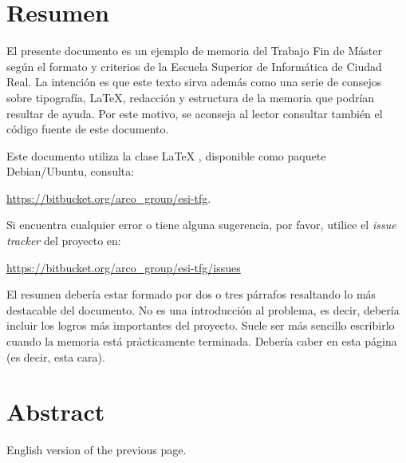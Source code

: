 \chapter{Resumen}

El presente documento es un ejemplo de memoria del Trabajo Fin de Máster según
el formato y criterios de la Escuela Superior de Informática de Ciudad Real. La
intención es que este texto sirva además como una serie de consejos sobre
tipografía, \LaTeX, redacción y estructura de la memoria que podrían resultar de
ayuda. Por este motivo, se aconseja al lector consultar también el código fuente
de este documento.

Este documento utiliza la clase \LaTeX{} \esitfm{}, disponible como paquete
Debian/Ubuntu, consulta:

 \url{https://bitbucket.org/arco_group/esi-tfg}.

Si encuentra cualquier error o tiene alguna sugerencia, por favor, utilice
el \emph{issue tracker} del proyecto \esitfm{} en:

\url{https://bitbucket.org/arco_group/esi-tfg/issues}

El resumen debería estar formado por dos o tres párrafos resaltando lo más
destacable del documento. No es una introducción al problema, es decir, debería
incluir los logros más importantes del proyecto. Suele ser más sencillo
escribirlo cuando la memoria está prácticamente terminada. Debería caber en esta
página (es decir, esta cara).


\chapter{Abstract}

English version of the previous page.
